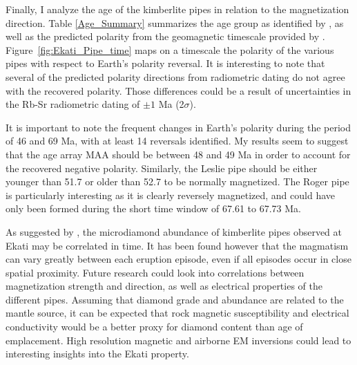 Finally, I analyze the age of the kimberlite pipes in relation to the magnetization direction.
Table \ref{Age_Summary} summarizes the age group as identified by \cite{Lockhart2004}, as well as the predicted polarity from the geomagnetic timescale provided by \cite{Cande1995}.
Figure~\ref{fig:Ekati_Pipe_time} maps on a timescale the polarity of the various pipes with respect to Earth's polarity reversal.
It is interesting to note that several of the predicted polarity directions from radiometric dating do not agree with the recovered polarity.
Those differences could be a result of uncertainties in the Rb-Sr radiometric dating of $\pm1$ Ma (2$\sigma$).

It is important to note the frequent changes in Earth's polarity during the period of 46 and 69 Ma, with at least 14 reversals identified.
My results seem to suggest that the age array MAA should be between 48 and 49 Ma in order to account for the recovered negative polarity.
Similarly, the Leslie pipe should be either younger than 51.7 or older than 52.7 to be normally magnetized.
The Roger pipe is particularly interesting as it is clearly reversely magnetized, and could have only been formed during the short time window of 67.61 to 67.73 Ma.

As suggested by \cite{Lockhart2004}, the microdiamond abundance of kimberlite pipes observed at Ekati may be correlated in time.
It has been found however that the magmatism can vary greatly between each eruption episode, even if all episodes occur in close spatial proximity.
Future research could look into correlations between magnetization strength and direction, as well as electrical properties of the different pipes.
Assuming that diamond grade and abundance are related to the mantle source, it can be expected that rock magnetic susceptibility and electrical conductivity would be a better proxy for diamond content than age of emplacement.
High resolution magnetic and airborne EM inversions could lead to interesting insights into the Ekati property.


